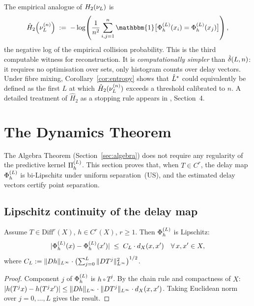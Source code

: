 \begin{remark}
\label{rem:entropy-witness}
The empirical analogue of $H_2(\nu_L)$ is
\[
  \hat{H}_2\!\left(\nuL^{(n)}\right)
  \;:=\;
  -\log\!\left(\frac{1}{n^2}\sum_{i,j=1}^n
    \mathbbm{1}\bigl[\PhiL(x_i) = \PhiL(x_j)\bigr]\right),
\]
the negative log of the empirical collision probability.
This is the third computable witness for reconstruction.
It is \emph{computationally simpler} than $\hat{\delta}(L,n)$: it requires no
optimisation over sets, only histogram counts over delay vectors.
Under fibre mixing, Corollary~\ref{cor:entropy} shows that $\hat{L}^*$ could
equivalently be defined as the first $L$ at which $\hat{H}_2(\nu_L^{(n)})$
exceeds a threshold calibrated to $n$.
A detailed treatment of $\hat{H}_2$ as a stopping rule appears in
\cite{mahon_bridge}, Section~4.
\end{remark}

\section{The Dynamics Theorem}
\label{sec:dynamics}

The Algebra Theorem (Section~\ref{sec:algebra}) does not require any
regularity of the predictive kernel $\Pi_h^{(L)}$.
This section proves that, when $T \in C^r$, the delay map $\Phi_h^{(L)}$ is
bi-Lipschitz under uniform separation~(US), and the estimated delay
vectors certify point separation.

\subsection{Lipschitz continuity of the delay map}

\begin{lemma}
\label{lem:upper-lip}
Assume $T \in \mathrm{Diff}^r(X)$, $h \in C^r(X)$, $r \geq 1$.
Then $\Phi_h^{(L)}$ is Lipschitz:
\[
  |\Phi_h^{(L)}(x) - \Phi_h^{(L)}(x')| \;\leq\; C_L \cdot d_X(x,x')
  \quad\forall\, x, x' \in X,
\]
where $C_L := \|Dh\|_{L^{\infty}} \cdot \bigl(\sum_{j=0}^{L}
\|DT^j\|_{L^{\infty}}^2\bigr)^{1/2}$.
\end{lemma}

\begin{proof}
Component $j$ of $\Phi_h^{(L)}$ is $h \circ T^j$.
By the chain rule and compactness of $X$:
$|h(T^j x) - h(T^j x')| \leq \|Dh\|_{L^{\infty}} \cdot \|DT^j\|_{L^{\infty}} \cdot d_X(x,x')$.
Taking Euclidean norm over $j = 0, \ldots, L$ gives the result.
\end{proof}

